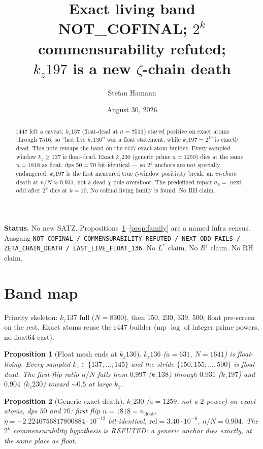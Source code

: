 \documentclass[11pt]{article}
\title{\bfseries Exact living band\\[2mm]
\large NOT\_COFINAL; $2^k$ commensurability refuted;\\
$k_z197$ is a new $\zeta$-chain death}
\author{Stefan Hamann}
\date{August 30, 2026}
\newtheorem{prop}{Proposition}
\begin{document}
\maketitle

\begin{abstract}\noindent
r447 left a caveat: $k_z137$ (float-dead at
$n=7511$) stayed positive on exact atoms through
$7516$, so ``last live $k_z136$'' was a float
statement, while $k_z197=2^{10}$ is exactly dead.
This note remaps the band on the r447 exact-atom
builder.
Every sampled window $k_z\ge 137$ is float-dead.
Exact $k_z230$ (generic prime $a=1259$) dies at
the same $n=1818$ as float, dps $50=70$
bit-identical --- so $2^k$ anchors are not
specially endangered.
$k_z197$ is the first measured true
$\zeta$-window positivity break: an
\emph{in-chain} death at $n/N\approx 0.931$,
not a dead-$\chi$ pole overshoot.
The predefined repair $a_k=$ next odd after
$2^k$ dies at $k=10$.
No cofinal living family is found.
No RH claim.
\end{abstract}

\medskip\noindent
\textbf{Status.}\enspace
No new SATZ.
Propositions~\ref{prop:mesh}--\ref{prop:family}
are a named infra census.
Ausgang
\texttt{NOT\_COFINAL / COMMENSURABILITY\_REFUTED / NEXT\_ODD\_FAILS / ZETA\_CHAIN\_DEATH / LAST\_LIVE\_FLOAT\_136}.
No $L^{*}$ claim.  No $R^{\dagger}$ claim.  No RH claim.

\section{Band map}\label{sec:map}

Priority skeleton: $k_z137$ full ($N=8300$),
then $150$, $230$, $339$, $500$; float
pre-screen on the rest.
Exact atoms reuse the r447 builder
(mp $\log$ of integer prime powers, no
float64 cast).

\begin{prop}[Float mesh ends at $k_z136$]\label{prop:mesh}
$k_z136$ ($a=631$, $N=1641$) is float-living.
Every sampled $k_z\in\{137,\ldots,145\}$ and
the stride $\{150,155,\ldots,500\}$ is
float-dead.
The first-flip ratio $n/N$ falls from
$0.997$ ($k_z138$) through $0.931$ ($k_z197$)
and $0.904$ ($k_z230$) toward $\sim 0.5$ at
large $k_z$.
\end{prop}

\begin{prop}[Generic exact death]\label{prop:generic}
$k_z230$ ($a=1259$, not a $2$-power) on exact
atoms, dps $50$ and $70$: first flip
$n=1818=n_{\mathrm{float}}$,
$\eta=-2.2240756817800884\cdot 10^{-12}$
bit-identical,
$\mathrm{rel}=3.40\cdot 10^{-6}$,
$n/N=0.904$.
The $2^k$ commensurability hypothesis is
REFUTED: a generic anchor dies exactly, at
the same place as float.
\end{prop}
\end{document}
